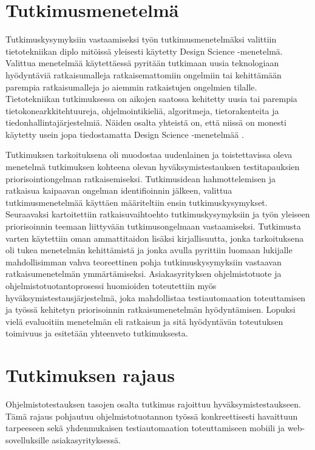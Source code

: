   \section{Tutkimusmenetelmä} \label{ch:06_tutkimusmenetelma}

  Tut\-ki\-mus\-ky\-sy\-myk\-siin vastaamiseksi työn tut\-ki\-mus\-me\-ne\-tel\-mäk\-si valittiin tie\-to\-tek\-nii\-kan dip\-lo\- mi\-töis\-sä  yleisesti käytetty Design Science -menetelmä.
  Valittua menetelmää käytettäessä pyritään tutkimaan uusia teknologiaan hyödyntäviä ratkaisumalleja ratkaisemattomiin ongelmiin tai kehittämään parempia ratkaisumalleja jo aiemmin ratkaistujen ongelmien tilalle.
  Tietotekniikan tutkimuksessa on aikojen saatossa kehitetty uusia tai parempia tietokonearkkitehtuureja, ohjelmointikieliä, algoritmeja, tietorakenteita ja tiedonhallintajärjestelmiä.
  Näiden osalta yhteistä on, että niissä on monesti käytetty usein jopa tiedostamatta Design Science -menetelmää \parencite{design_science_history}.

  Tutkimuksen tarkoituksena oli muodostaa uudenlainen ja toistettavissa oleva menetelmä tutkimuksen kohteena olevan hyväksymistestauksen testitapauksien priorisointiongelman ratkaisemiseksi.
  Tutkimusidean hahmottelemisen ja ratkaisua kaipaavan ongelman identifioinnin jälkeen, valittua tutkimusmenetelmää käyttäen määriteltiin ensin tutkimuskysymykset.
  Seuraavaksi kartoitettiin ratkaisuvaihtoehto tutkimuskysymyksiin ja työn yleiseen priorisoinnin teemaan liittyvään tutkimusongelmaan vastaamiseksi.
  Tutkimusta varten käytettiin oman ammattitaidon lisäksi kirjallisuutta, jonka tarkoituksena oli tukea menetelmän kehittämistä ja jonka avulla pyrittiin luomaan lukijalle mahdollisimman vahva teoreettinen pohja tutkimuskysymyksiin vastaavan ratkaisumenetelmän ymmärtämiseksi.
  Asiakasyrityksen ohjelmistotuote ja ohjelmistotuotantoprosessi huomioiden toteutettiin myös hyväksymistestausjärjestelmä, joka mahdollistaa testiautomaation toteuttamisen ja työssä kehitetyn priorisoinnin ratkaisumenetelmän hyödyntämisen.
  Lopuksi vielä evaluoitiin menetelmän eli ratkaisun ja sitä hyödyntävän toteutuksen toimivuus ja esitetään yhteenveto tutkimuksesta.

\section{Tutkimuksen rajaus} \label{ch:06_tutkimuksen_rajaus}

  Ohjelmistotestauksen tasojen osalta tutkimus rajoittuu hyväksymistestaukseen.
  Tämä rajaus pohjautuu ohjelmistotuotannon työssä konkreettisesti havaittuun tarpeeseen sekä yhdenmukaisen testiautomaation toteuttamiseen mobiili ja web-sovelluksille asiakasyrityksessä.

